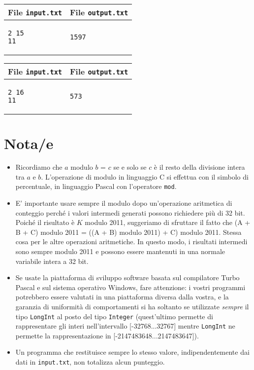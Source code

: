\documentclass[a4paper,11pt]{article}
\begin{document}
    \noindent
    \begin{tabular}{p{11cm}|p{5cm}}
    \toprule
    \textbf{File \texttt{input.txt}}
    & \textbf{File \texttt{output.txt}}
    \\
    \midrule
    \scriptsize
    \begin{verbatim}
2 15
11
\end{verbatim}
    &
    \scriptsize
    \begin{verbatim}
1597
\end{verbatim}
    \\
    \bottomrule
    \end{tabular}
  
    \noindent
    \begin{tabular}{p{11cm}|p{5cm}}
    \toprule
    \textbf{File \texttt{input.txt}}
    & \textbf{File \texttt{output.txt}}
    \\
    \midrule
    \scriptsize
    \begin{verbatim}
2 16
11
\end{verbatim}
    &
    \scriptsize
    \begin{verbatim}
573
\end{verbatim}
    \\
    \bottomrule
    \end{tabular}
  
\section*{Nota/e}
\begin{itemize}
  
    \item  Ricordiamo che $a$ modulo $b$ = $c$ se
e solo se $c$ è il resto della divisione intera tra
$a$ e $b$. L'operazione di modulo in linguaggio C si
effettua con il simbolo di percentuale, in linguaggio Pascal con
l'operatore \texttt{mod}.

    \item E' importante usare sempre il modulo dopo un'operazione aritmetica
di conteggio perché i valori intermedi generati possono
richiedere più di 32 bit. Poiché il risultato è
$K$ modulo 2011, suggeriamo di sfruttare il fatto che (A + B
+ C) modulo 2011 = ((A + B) modulo 2011) + C) modulo 2011. Stessa cosa
per le altre operazioni aritmetiche. In questo modo, i risultati
intermedi sono sempre modulo 2011 e possono essere mantenuti in una
normale variabile intera a 32 bit.
    \item 
Se usate la piattaforma di sviluppo software basata sul compilatore
Turbo Pascal e sul sistema operativo Windows, fare attenzione: i
vostri programmi potrebbero essere valutati in una piattaforma diversa
dalla vostra, e la garanzia di uniformità di comportamenti si
ha soltanto se utilizzate \emph{sempre} il tipo \texttt{LongInt}
al posto del tipo \texttt{Integer} (quest'ultimo permette di
rappresentare gli interi nell'intervallo [-32768...32767] mentre
\texttt{LongInt} ne permette la rappresentazione in
[-2147483648...2147483647]).

    \item Un programma che restituisce sempre lo stesso valore,
indipendentemente dai dati in \texttt{input.txt}, non totalizza
alcun punteggio.
\end{itemize}
\end{document}
